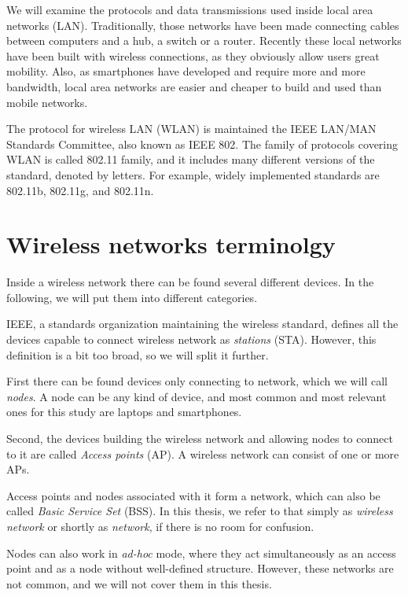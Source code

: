 \documentclass[12pt,a4paper,oneside,pdftex]{report}
\begin{document}
We will examine the protocols and data transmissions used inside local area networks (LAN). Traditionally, those networks have been made connecting cables between computers and a hub, a switch or a router. Recently these local networks have been built with wireless connections, as they obviously allow users great mobility. Also, as smartphones have developed and require more and more bandwidth, local area networks are easier and cheaper to build and used than mobile networks.

The protocol for wireless LAN (WLAN) is maintained the IEEE LAN/MAN Standards Committee, also known as IEEE 802. The family of protocols covering WLAN is called 802.11 family, and it includes many different versions of the standard, denoted by letters. For example, widely implemented standards are 802.11b, 802.11g, and 802.11n.~\cite{IEEE802.11}


\section{Wireless networks terminolgy}
\label{sec:terminology}

Inside a wireless network there can be found several different devices. In the following, we will put them into different categories.

IEEE, a standards organization maintaining the wireless standard, defines all the devices capable to connect wireless network as \emph{stations} (STA). However, this definition is a bit too broad, so we will split it further.

First there can be found devices only connecting to network, which we will call \emph{nodes}. A node can be any kind of device, and most common and most relevant ones for this study are laptops and smartphones. 

Second, the devices building the wireless network and allowing nodes to connect to it are called \emph{Access points} (AP). A wireless network can consist of one or more APs.

Access points and nodes associated with it form a network, which can also be called \emph{Basic Service Set} (BSS). In this thesis, we refer to that simply as \emph{wireless network} or shortly as \emph{network}, if there is no room for confusion.

Nodes can also work in \emph{ad-hoc} mode, where they act simultaneously as an access point and as a node without well-defined structure. However, these networks are not common, and we will not cover them in this thesis.
\end{document}
